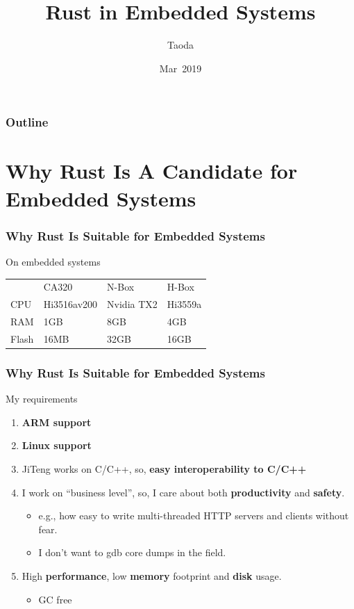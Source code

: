 \documentclass[lualatex,utf8]{beamer}
\title[Embedded Rust]{Rust in Embedded Systems}
\author{Taoda}
\institute{YITU tech}
\date{Mar\ 2019}
\renewcommand{\emph}{\textbf}
\begin{document}
\begin{frame}
\titlepage
\end{frame}

\begin{frame}
  \frametitle{Outline}
  \tableofcontents
\end{frame}


\section{Why Rust Is A Candidate for Embedded Systems}


\begin{frame}
  \frametitle{Why Rust Is Suitable for Embedded Systems}
  \begin{block}{On embedded systems}
    \begin{tabu}{*4{X[c]}}
      & CA320 & N-Box & H-Box \\
      CPU & Hi3516av200 & Nvidia TX2 & Hi3559a \\
      RAM & 1GB & 8GB & 4GB \\
      Flash & 16MB & 32GB & 16GB \\
    \end{tabu}
  \end{block}
\end{frame}

\begin{frame}
  \frametitle{Why Rust Is Suitable for Embedded Systems}
  \begin{block}{My requirements}
    \begin{enumerate}
    \item \emph{ARM support}
    \item \emph{Linux support}
    \item JiTeng works on C/C++, so, \emph{easy interoperability to C/C++}
    \item I work on ``business level'', so, I care about both \emph{productivity} and \emph{safety}.
      \begin{itemize}
      \item e.g., how easy to write multi-threaded HTTP servers and clients without fear.
      \item I don't want to gdb core dumps in the field.
      \end{itemize}
    \item High \emph{performance}, low \emph{memory} footprint and \emph{disk} usage.
      \begin{itemize}
      \item GC free
      \end{itemize}
    \end{enumerate}
  \end{block}
\end{frame}
\end{document}
